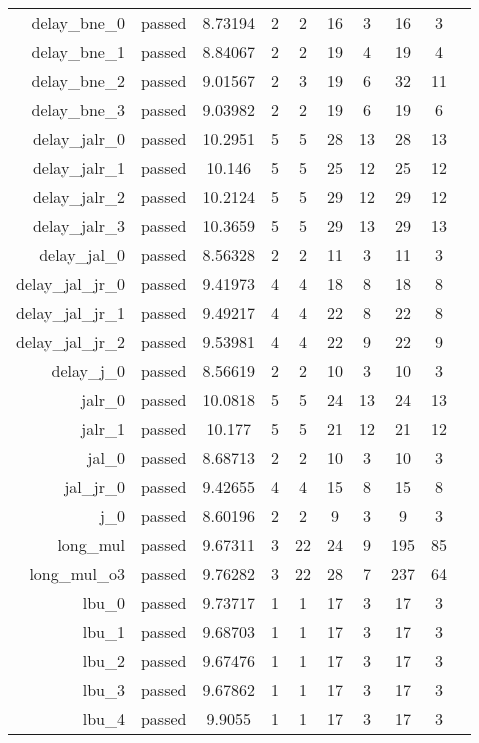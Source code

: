 \begin{longtable}{r|ccccccccc}
    delay\_bne\_0 & passed & 8.73194 & 2 & 2 & 16 & 3 & 16 & 3 \\
    delay\_bne\_1 & passed & 8.84067 & 2 & 2 & 19 & 4 & 19 & 4 \\
    delay\_bne\_2 & passed & 9.01567 & 2 & 3 & 19 & 6 & 32 & 11 \\
    delay\_bne\_3 & passed & 9.03982 & 2 & 2 & 19 & 6 & 19 & 6 \\
    delay\_jalr\_0 & passed & 10.2951 & 5 & 5 & 28 & 13 & 28 & 13 \\
    delay\_jalr\_1 & passed & 10.146 & 5 & 5 & 25 & 12 & 25 & 12 \\
    delay\_jalr\_2 & passed & 10.2124 & 5 & 5 & 29 & 12 & 29 & 12 \\
    delay\_jalr\_3 & passed & 10.3659 & 5 & 5 & 29 & 13 & 29 & 13 \\
    delay\_jal\_0 & passed & 8.56328 & 2 & 2 & 11 & 3 & 11 & 3 \\
    delay\_jal\_jr\_0 & passed & 9.41973 & 4 & 4 & 18 & 8 & 18 & 8 \\
    delay\_jal\_jr\_1 & passed & 9.49217 & 4 & 4 & 22 & 8 & 22 & 8 \\
    delay\_jal\_jr\_2 & passed & 9.53981 & 4 & 4 & 22 & 9 & 22 & 9 \\
    delay\_j\_0 & passed & 8.56619 & 2 & 2 & 10 & 3 & 10 & 3 \\
    jalr\_0 & passed & 10.0818 & 5 & 5 & 24 & 13 & 24 & 13 \\
    jalr\_1 & passed & 10.177 & 5 & 5 & 21 & 12 & 21 & 12 \\
    jal\_0 & passed & 8.68713 & 2 & 2 & 10 & 3 & 10 & 3 \\
    jal\_jr\_0 & passed & 9.42655 & 4 & 4 & 15 & 8 & 15 & 8 \\
    j\_0 & passed & 8.60196 & 2 & 2 & 9 & 3 & 9 & 3 \\
    long\_mul & passed & 9.67311 & 3 & 22 & 24 & 9 & 195 & 85 \\
    long\_mul\_o3 & passed & 9.76282 & 3 & 22 & 28 & 7 & 237 & 64 \\
    lbu\_0 & passed & 9.73717 & 1 & 1 & 17 & 3 & 17 & 3 \\
    lbu\_1 & passed & 9.68703 & 1 & 1 & 17 & 3 & 17 & 3 \\
    lbu\_2 & passed & 9.67476 & 1 & 1 & 17 & 3 & 17 & 3 \\
    lbu\_3 & passed & 9.67862 & 1 & 1 & 17 & 3 & 17 & 3 \\
    lbu\_4 & passed & 9.9055 & 1 & 1 & 17 & 3 & 17 & 3 \\

\end{longtable}

